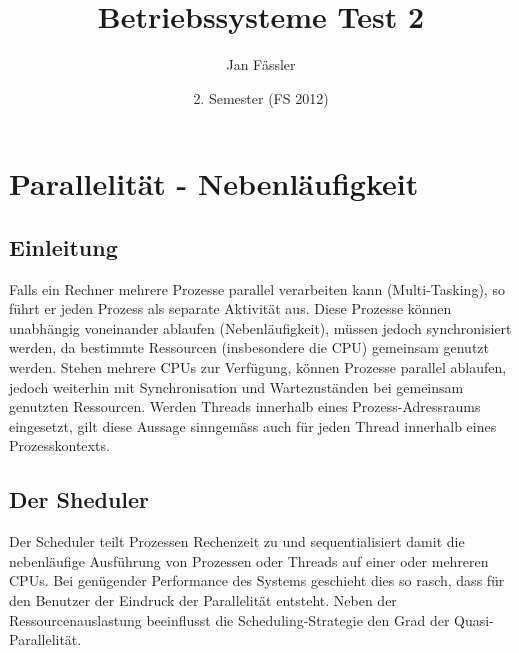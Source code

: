 \documentclass[a4paper, 10pt]{article}
\title{Betriebssysteme Test 2}
\author{Jan F\"assler}
\date{2. Semester (FS 2012)}
\begin{document}
\maketitle
\thispagestyle{fancy}

\newpage


\tableofcontents	  	


\newpage
\setcounter{page}{1}

\section{Parallelit\"at - Nebenl\"aufigkeit}
\subsection{Einleitung}
Falls ein Rechner mehrere Prozesse parallel verarbeiten kann (Multi-Tasking), so f\"uhrt er jeden Prozess als separate Aktivit\"at aus. Diese Prozesse können unabh\"angig voneinander ablaufen (Nebenl\"aufigkeit), m\"ussen jedoch synchronisiert werden, da bestimmte Ressourcen (insbesondere die CPU) gemeinsam genutzt werden. Stehen mehrere CPUs zur Verf\"ugung, können Prozesse parallel ablaufen, jedoch weiterhin mit Synchronisation und Wartezust\"anden bei gemeinsam genutzten Ressourcen. Werden Threads innerhalb eines Prozess-Adressraums eingesetzt, gilt diese Aussage sinngem\"ass auch f\"ur jeden Thread innerhalb eines Prozesskontexts.

\subsection{Der Sheduler}
Der Scheduler teilt Prozessen Rechenzeit zu und sequentialisiert damit die nebenl\"aufige Ausf\"uhrung von Prozessen oder Threads auf einer oder mehreren CPUs. Bei gen\"ugender Performance des Systems geschieht dies so rasch, dass f\"ur den Benutzer der Eindruck der Parallelit\"at entsteht. Neben der Ressourcenauslastung beeinflusst die Scheduling-Strategie den Grad der Quasi-Parallelit\"at.
\end{document}
